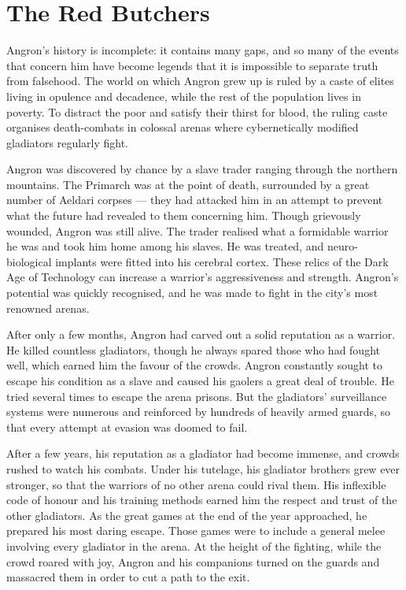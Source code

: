 \section{The Red Butchers}

Angron's history is incomplete: it contains many gaps, and so many of the events that concern him have become legends that it is impossible to separate truth from falsehood. The world on which Angron grew up is ruled by a caste of elites living in opulence and decadence, while the rest of the population lives in poverty. To distract the poor and satisfy their thirst for blood, the ruling caste organises death-combats in colossal arenas where cybernetically modified gladiators regularly fight.

Angron was discovered by chance by a slave trader ranging through the northern mountains. The Primarch was at the point of death, surrounded by a great number of Aeldari corpses --- they had attacked him in an attempt to prevent what the future had revealed to them concerning him. Though grievously wounded, Angron was still alive. The trader realised what a formidable warrior he was and took him home among his slaves. He was treated, and neuro-biological implants were fitted into his cerebral cortex. These relics of the Dark Age of Technology can increase a warrior's aggressiveness and strength. Angron's potential was quickly recognised, and he was made to fight in the city's most renowned arenas.

After only a few months, Angron had carved out a solid reputation as a warrior. He killed countless gladiators, though he always spared those who had fought well, which earned him the favour of the crowds. Angron constantly sought to escape his condition as a slave and caused his gaolers a great deal of trouble. He tried several times to escape the arena prisons. But the gladiators' surveillance systems were numerous and reinforced by hundreds of heavily armed guards, so that every attempt at evasion was doomed to fail.

After a few years, his reputation as a gladiator had become immense, and crowds rushed to watch his combats. Under his tutelage, his gladiator brothers grew ever stronger, so that the warriors of no other arena could rival them. His inflexible code of honour and his training methods earned him the respect and trust of the other gladiators. As the great games at the end of the year approached, he prepared his most daring escape. Those games were to include a general melee involving every gladiator in the arena. At the height of the fighting, while the crowd roared with joy, Angron and his companions turned on the guards and massacred them in order to cut a path to the exit.

